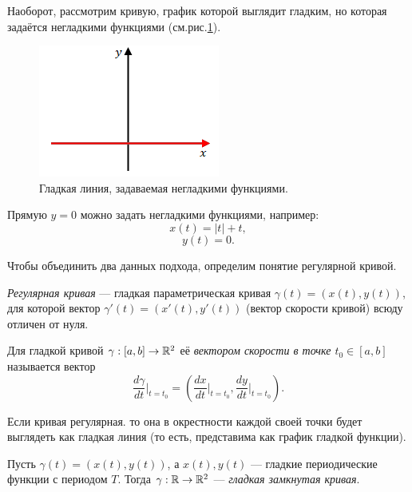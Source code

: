 \begin{example}
    Наоборот, рассмотрим кривую, график которой выглядит гладким, но которая задаётся негладкими функциями (см.рис.\ref{fig:c12.3}).
    \begin{figure}[ht]
        \centering
        \includegraphics[scale=0.7]{images/c12.3.png}
        \caption{Гладкая линия, задаваемая негладкими функциями.}
        \label{fig:c12.3}
    \end{figure}
    Прямую $y = 0$ можно задать негладкими функциями, например:
    \[x(t) = |t| + t,\]
    \[y(t) = 0.\]
\end{example}

Чтобы объединить два данных подхода, определим понятие регулярной кривой.

\begin{definition}
    \textit{Регулярная кривая} — гладкая параметрическая кривая $\gamma(t) = (x(t), y(t))$, для которой вектор $\gamma'(t) = (x'(t), y'(t))$ (вектор скорости кривой) всюду отличен от нуля.
\end{definition}

\begin{definition}
    Для гладкой кривой $\gamma: [a,b] \to \mathbb{R}^2$ её \textit{вектором скорости в точке $t_0 \in [a,b]$} называется вектор 
    \[\frac{d\gamma}{dt}\Big|_{t=t_0} = \left(\frac{dx}{dt}\Big|_{t=t_0}, \frac{dy}{dt}\Big|_{t=t_0}\right).\]
\end{definition}

\begin{remark}
    Если кривая регулярная. то она в окрестности каждой своей точки будет выглядеть как гладкая линия (то есть, представима как график гладкой функции).
\end{remark}

\begin{definition}
    Пусть $\gamma(t) = (x(t), y(t))$, а $x(t), y(t)$ — гладкие периодические функции с периодом $T$. Тогда $\gamma: \mathbb{R} \to \mathbb{R}^2$ — \textit{гладкая замкнутая кривая}.
\end{definition} 

